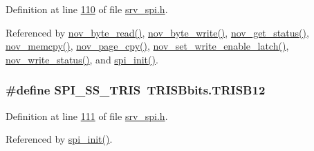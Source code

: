 Definition at line \hyperlink{a00013_source_l00110}{110} of file \hyperlink{a00013_source}{srv\+\_\+spi.\+h}.



Referenced by \hyperlink{a00060_source_l00633}{nov\+\_\+byte\+\_\+read()}, \hyperlink{a00060_source_l00608}{nov\+\_\+byte\+\_\+write()}, \hyperlink{a00060_source_l00567}{nov\+\_\+get\+\_\+status()}, \hyperlink{a00060_source_l00723}{nov\+\_\+memcpy()}, \hyperlink{a00060_source_l00663}{nov\+\_\+page\+\_\+cpy()}, \hyperlink{a00060_source_l00553}{nov\+\_\+set\+\_\+write\+\_\+enable\+\_\+latch()}, \hyperlink{a00060_source_l00586}{nov\+\_\+write\+\_\+status()}, and \hyperlink{a00032_source_l00030}{spi\+\_\+init()}.

\hypertarget{a00013_a1424f86a2482cfbcf68f709ce542e262}{
\subsubsection[{S\+P\+I\+\_\+\+S\+S\+\_\+\+T\+R\+I\+S}]{\setlength{\rightskip}{0pt plus 5cm}\#define S\+P\+I\+\_\+\+S\+S\+\_\+\+T\+R\+I\+S~T\+R\+I\+S\+Bbits.\+T\+R\+I\+S\+B12}}\label{a00013_a1424f86a2482cfbcf68f709ce542e262}


Definition at line \hyperlink{a00013_source_l00111}{111} of file \hyperlink{a00013_source}{srv\+\_\+spi.\+h}.



Referenced by \hyperlink{a00032_source_l00030}{spi\+\_\+init()}.



